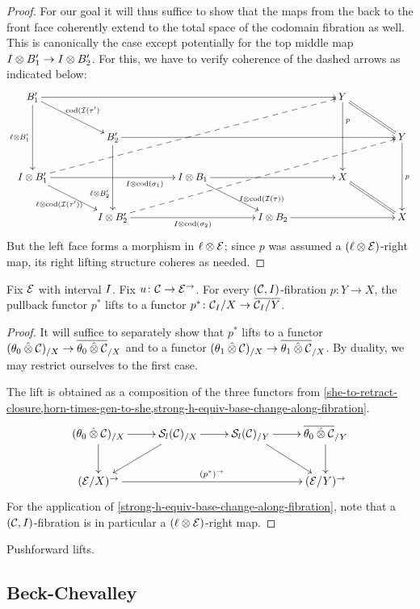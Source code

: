 \documentclass[reqno,10pt,a4paper,oneside]{amsart}
\begin{document}
\begin{proof}
For our goal it will thus suffice to show that the maps from the back to the front face coherently extend to the total space of the codomain fibration as well.
This is canonically the case except potentially for the top middle map $\interval \otimes B_1' \to \interval \otimes B_2'$.
For this, we have to verify coherence of the dashed arrows as indicated below:
\[
\xymatrix@C+2em{
  B_1'
  \ar[rrrr]
  \ar[dd]_{\intervall \otimes B_1'}
  \ar[dr]^{\cod(\cal{I}(\tau')}
&&&&
  Y
  \ar[dd]^(0.3){p}
  \ar@{=}[dr]
\\&
  B_2'
  \ar[rrrr]
  \ar[dd]_(0.7){\intervall \otimes B_2'}
&&&&
  Y
  \ar[dd]^{p}
\\
  \interval \otimes B_1'
  \ar[rr]_(0.7){I \otimes \cod(\sigma_1)}
  \ar@{-->}[uurrrr]
  \ar[dr]_{\intervall \otimes \cod(\cal{I}(\tau'))}
&&
  \interval \otimes B_1
  \ar[rr]
  \ar[dr]^(0.7){\interval \otimes \cod(\cal{I}(\tau))}
&&
  X
  \ar@{=}[dr]
\\&
  \interval \otimes B_2'
  \ar[rr]_{I \otimes \cod(\sigma_2)}
  \ar@{-->}[uurrrr]
&&
  \interval \otimes B_2
  \ar[rr]
&&
  X
}
\]
But the left face forms a morphism in $\intervall \otimes \catE$; since $p$ was assumed a $(\intervall \otimes \catE)$-right map, its right lifting structure coheres as needed.
\end{proof}

\begin{theorem}
Fix $\cal{E}$ with interval $\interval$.
Fix $u \co \cal{C} \to \cal{E}^\to$.
For every $(\cal{C}, I)$-fibration $p : Y \to X$, the pullback functor $p^*$ lifts to a functor $p^* \co \cal{C}_I/X \to \overline{\cal{C}_I/Y}$.
\end{theorem}

\begin{proof}
It will suffice to separately show that $p^*$ lifts to a functor $(\thetal \hatotimes \cal{C})_{/X} \to \overline{\thetal \hatotimes \cal{C}}_{/X}$ and to a functor $(\thetar \hatotimes \cal{C})_{/X} \to \overline{\thetar \hatotimes \cal{C}}_{/X}$.
By duality, we may restrict ourselves to the first case.

The lift is obtained as a composition of the three functors from \cref{she-to-retract-closure,horn-times-gen-to-she,strong-h-equiv-base-change-along-fibration}.
\[
\xymatrix{
  (\thetal \hatotimes \cal{C})_{/X}
  \ar[r]
  \ar[d]
&
  \cal{S}_l(\cal{C})_{/X}
  \ar[r]
  \ar[dl]
&
  \cal{S}_l(\cal{C})_{/Y}
  \ar[r]
  \ar[dr]
&
  \overline{\thetal \hatotimes \cal{C}}_{/Y}
  \ar[d]
\\
  (\catE/X)^{\to}
  \ar[rrr]^{(p^*)^{\to}}
&&&
  (\catE/Y)^{\to}
}
\]
For the application of \cref{strong-h-equiv-base-change-along-fibration}, note that a $(\cal{C}, \interval)$-fibration is in particular a $(\intervall \otimes \calE)$-right map.
\end{proof}

\begin{corollary}
Pushforward lifts.
\end{corollary}

\subsection*{Beck-Chevalley} 




\end{document}
